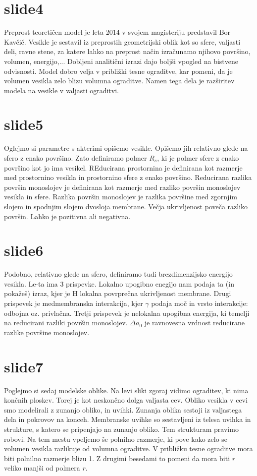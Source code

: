 \documentclass[openany, longbibliography,slovene,a4paper,12pt]{book}
\begin{document}
\section{slide4}
Preprost teoretičen model je leta 2014 v svojem magisteriju predstavil Bor Kavčič. Vesikle je sestavil iz preprostih geometrijski oblik kot so sfere, valjasti deli, ravne stene, za katere lahko na preprost način izračunamo njihovo površino, volumen, energijo,... Dobljeni analitični izrazi dajo boljši vpogled na bistvene odvisnosti. Model dobro velja v približki tesne ograditve, kar pomeni, da je volumen vesikla zelo blizu volumna ograditve. Namen tega dela je razširitev modela na vesikle v valjasti ograditvi.

\section{slide5}
Oglejmo si parametre s akterimi opišemo vesikle. Opišemo jih relativno glede na sfero z enako površino. Zato definiramo polmer $R_s$, ki je polmer sfere z enako površino kot jo ima vesikel. REducirana prostornina je definirana kot razmerje med prostornino vesikla in prostornino sfere z enako površino. Reducirana razlika površin monoslojev je definirana kot razmerje med razliko površin monoslojev vesikla in sfere. Razlika površin monoslojev je razlika površine med zgornjim slojem in spodnjim slojem dvosloja membrane. Večja ukrivljenost poveča razliko površin. Lahko je pozitivna ali negativna.

\section {slide6}
Podobno, relativno glede na sfero, definiramo tudi brezdimenzijsko energijo vesikla. Le-ta ima 3 prispevke. Lokalno upogibno enegijo nam podaja ta (in pokažeš) izraz, kjer je H lokalna povrprečna ukrivljenost membrane. Drugi prispevek je medmembranska interakcija, kjer $\gamma$ podaja moč in vrsto interakcije: odbojna oz. privlačna. Tretji prispevek je nelokalna upogibna energija, ki temelji na reducirani razliki površin monoslojev. $\Delta a_0$ je ravnovesna vrdnost reducirane razlike površine monoslojev.

\section{slide7}
Poglejmo si sedaj modelske oblike. Na levi sliki zgoraj vidimo ograditev, ki nima končnih ploskev. Torej je kot neskončno dolga valjasta cev. Obliko vesikla v cevi smo modelirali z zunanjo obliko, in uvihki. Zunanja oblika sestoji iz valjastega dela in pokrovov na konceh. Membranske uvihke so sestavljeni iz telesa uvihka in strukture, s katero se pripenjajo na zunanjo obliko. Tem strukturam pravimo robovi. Na tem mestu vpeljemo še polnilno razmerje, ki pove kako zelo se volumen vesikla razlikuje od volumna ograditve. V približku tesne ograditve mora biti polnilno razmerje blizu 1. Z drugimi besedami to pomeni da mora biti $r$ veliko manjši od polmera $r$.
\end{document}
